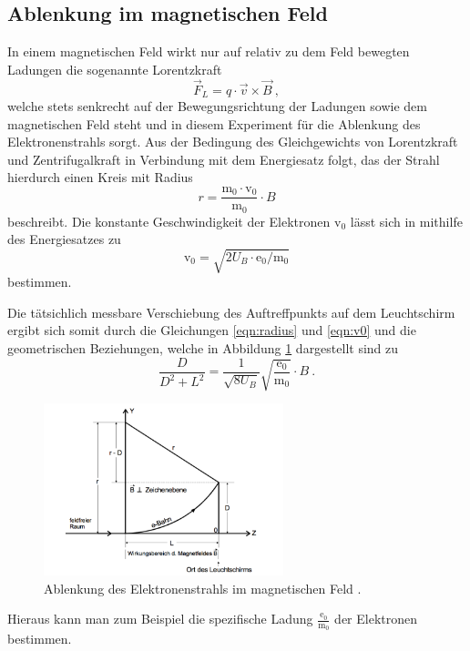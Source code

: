 \subsection{Ablenkung im magnetischen Feld}
In einem magnetischen Feld wirkt nur auf relativ zu dem Feld bewegten Ladungen die sogenannte
Lorentzkraft
\begin{equation}
  \vec{F}_L = q \cdot \vec{v} \times \vec{B} \: ,
  \label{eqn:lorentz}
\end{equation}
welche stets senkrecht auf der Bewegungsrichtung der Ladungen sowie dem magnetischen
Feld steht und in diesem Experiment für die Ablenkung des Elektronenstrahls sorgt.
Aus der Bedingung des Gleichgewichts von Lorentzkraft und Zentrifugalkraft in Verbindung
mit dem Energiesatz folgt, das der Strahl hierdurch einen Kreis mit Radius
\begin{equation}
  r = \frac{\text{m}_0 \cdot \text{v}_0}{\text{m}_0} \cdot B
  \label{eqn:radius}
\end{equation}
beschreibt.
Die konstante Geschwindigkeit der Elektronen $\text{v}_0$ lässt sich in mithilfe
des Energiesatzes zu
\begin{equation}
  \text{v}_0 = \sqrt{2 U_B \cdot \text{e}_0 / \text{m}_0}
  \label{eqn:v0}
\end{equation}
bestimmen.

Die tätsichlich messbare Verschiebung des Auftreffpunkts auf dem Leuchtschirm
ergibt sich somit durch die Gleichungen \ref{eqn:radius} und \ref{eqn:v0} und die
geometrischen Beziehungen, welche in Abbildung \ref{fig:magnet} dargestellt sind zu
\begin{equation}
   \frac{D}{D^2 + L^2} = \frac{1}{\sqrt{8 U_B}}\sqrt{\frac{\text{e}_0}{\text{m}_0}}\cdot B \: .
   \label{eqn:magnet}
\end{equation}

\begin{figure}[H]
  \centering
  \includegraphics[height=5cm]{Magnet.png}
  \caption{Ablenkung des Elektronenstrahls im magnetischen Feld \cite{skript2}.}
  \label{fig:magnet}
\end{figure}
Hieraus kann man zum Beispiel die spezifische Ladung $ \frac{{\text{e}_0}}{{\text{m}_0}} $
der Elektronen bestimmen.
